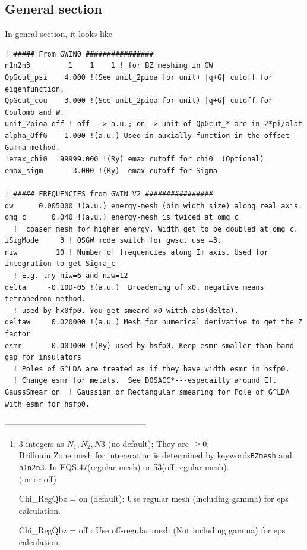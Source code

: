 \documentclass[a4paper,10pt,epsf,fleqn]{article}
\newcommand{\fx}[1]{\subsection{\sf #1\index{\sf #1}}}
\newcommand{\keyw}[1]{\fbox{\tt #1}}
\begin{document}
{\newpage
\fx{General section}
In genral section, it looks like
\begin{verbatim}
! ##### From GWIN0 ################ 
n1n2n3         1    1    1 ! for BZ meshing in GW 
QpGcut_psi    4.000 !(See unit_2pioa for unit) |q+G| cutoff for eigenfunction.
QpGcut_cou    3.000 !(See unit_2pioa for unit) |q+G| cutoff for Coulomb and W.
unit_2pioa off ! off --> a.u.; on--> unit of QpGcut_* are in 2*pi/alat 
alpha_OffG    1.000 !(a.u.) Used in auxially function in the offset-Gamma method.
!emax_chi0   99999.000 !(Ry) emax cutoff for chi0  (Optional)
emax_sigm       3.000 !(Ry)  emax cutoff for Sigma

! ##### FREQUENCIES from GWIN_V2 ################ 
dw      0.005000 !(a.u.) energy-mesh (bin width size) along real axis.
omg_c      0.040 !(a.u.) energy-mesh is twiced at omg_c
  !  coaser mesh for higher energy. Width get to be doubled at omg_c.
iSigMode     3 ! QSGW mode switch for gwsc. use =3.
niw         10 ! Number of frequencies along Im axis. Used for integration to get Sigma_c
  ! E.g. try niw=6 and niw=12
delta     -0.10D-05 !(a.u.)  Broadening of x0. negative means tetrahedron method.
  ! used by hx0fp0. You get smeard x0 witth abs(delta).
deltaw     0.020000 !(a.u.) Mesh for numerical derivative to get the Z factor
esmr       0.003000 !(Ry) used by hsfp0. Keep esmr smaller than band gap for insulators
  ! Poles of G^LDA are treated as if they have width esmr in hsfp0. 
  ! Change esmr for metals.  See DOSACC*---especailly around Ef.
GaussSmear on  ! Gaussian or Rectangular smearing for Pole of G^LDA with esmr for hsfp0.
\end{verbatim}

---------------------------------------------------\\
\begin{enumerate}
\item 
\keyw{n1n2n3} 3 integers as $N_1,N_2,N3$ (no default); They are $\ge 0$. \\
Brillouin Zone mesh for integeration
is determined by keywords{\tt BZmesh} and {\tt n1n2n3}. 
In EQS.47(regular mesh) or 53(off-regular mesh).\\

\keyw{Chi\_RegQbz} (on or off)

     Chi\_RegQbz = on (default): Use regular mesh (including gamma) for eps calculation.

     Chi\_RegQbz = off   : Use off-regular mesh (Not including gamma) for eps calculation.



\end{enumerate}}
\end{document}
